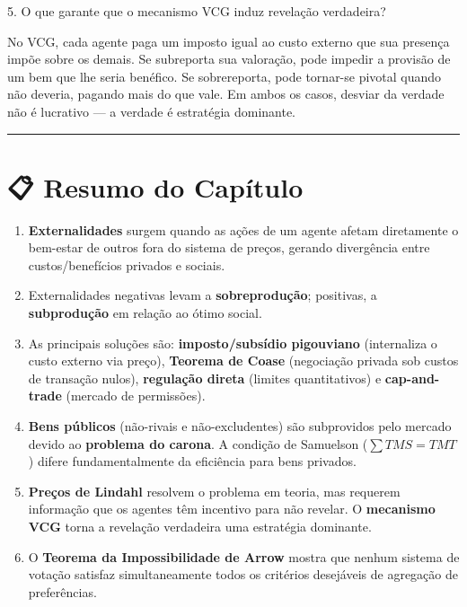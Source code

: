 \documentclass[11pt,twoside,openright]{book}
\providecommand{\tightlist}{\setlength{\itemsep}{0pt}\setlength{\parskip}{0pt}}
\begin{document}
\begin{infobox}{5. O que garante que o mecanismo VCG induz revelação verdadeira?}

No VCG, cada agente paga um imposto igual ao custo externo que sua
presença impõe sobre os demais. Se subreporta sua valoração, pode
impedir a provisão de um bem que lhe seria benéfico. Se sobrereporta,
pode tornar-se pivotal quando não deveria, pagando mais do que vale. Em
ambos os casos, desviar da verdade não é lucrativo --- a verdade é
estratégia dominante.

\end{infobox}

\begin{center}\rule{0.5\linewidth}{0.5pt}\end{center}

\section{📋 Resumo do Capítulo}\label{resumo-do-capuxedtulo-2}

\begin{enumerate}
\def\labelenumi{\arabic{enumi}.}
\tightlist
\item
  \textbf{Externalidades} surgem quando as ações de um agente afetam
  diretamente o bem-estar de outros fora do sistema de preços, gerando
  divergência entre custos/benefícios privados e sociais.
\item
  Externalidades negativas levam a \textbf{sobreprodução}; positivas, a
  \textbf{subprodução} em relação ao ótimo social.
\item
  As principais soluções são: \textbf{imposto/subsídio pigouviano}
  (internaliza o custo externo via preço), \textbf{Teorema de Coase}
  (negociação privada sob custos de transação nulos), \textbf{regulação
  direta} (limites quantitativos) e \textbf{cap-and-trade} (mercado de
  permissões).
\item
  \textbf{Bens públicos} (não-rivais e não-excludentes) são subprovidos
  pelo mercado devido ao \textbf{problema do carona}. A condição de
  Samuelson (\(\sum TMS = TMT\)) difere fundamentalmente da eficiência
  para bens privados.
\item
  \textbf{Preços de Lindahl} resolvem o problema em teoria, mas requerem
  informação que os agentes têm incentivo para não revelar. O
  \textbf{mecanismo VCG} torna a revelação verdadeira uma estratégia
  dominante.
\item
  O \textbf{Teorema da Impossibilidade de Arrow} mostra que nenhum
  sistema de votação satisfaz simultaneamente todos os critérios
  desejáveis de agregação de preferências.
\end{enumerate}
\end{document}
